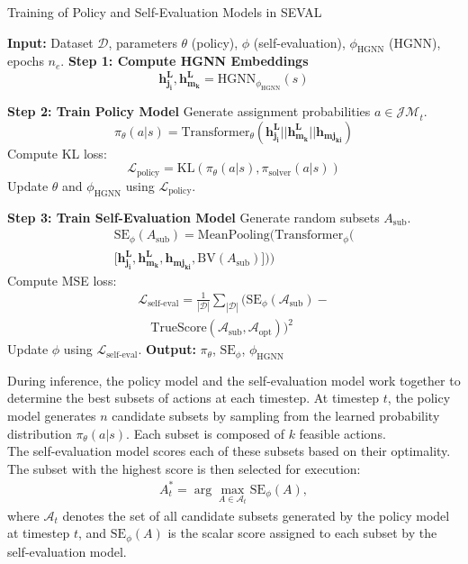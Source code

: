 \begin{algorithm}[h]
\caption{Training of Policy and Self-Evaluation Models in SEVAL}
\label{algo:training}
\begin{algorithmic}[1]
\STATE \textbf{Input:} Dataset $\mathcal{D}$, parameters $\theta$ (policy), $\phi$ (self-evaluation), $\phi_{\text{HGNN}}$ (HGNN), epochs $n_e$.
        \STATE \textbf{Step 1: Compute HGNN Embeddings}
        \[
        \boldsymbol{h_{j_{i}}^L}, \boldsymbol{h_{m_{k}}^L} = \text{HGNN}_{\phi_{\text{HGNN}}}(s)
        \]

        \STATE \textbf{Step 2: Train Policy Model}
        \STATE Generate assignment probabilities $a \in \mathcal{JM}_t$.
        \[
        \pi_\theta(a | s) = \text{Transformer}_{\theta}(\boldsymbol{h_{j_{i}}^L} || \boldsymbol{h_{m_{k}}^L} || \boldsymbol{h_{mj_{ki}}})
        \]
        \STATE Compute KL loss:
        \[
        \mathcal{L}_{\text{policy}} = \text{KL}(\pi_\theta(a | s), \pi_\text{solver}(a | s))
        \]
        \STATE Update $\theta$ and $\phi_{\text{HGNN}}$ using $\mathcal{L}_{\text{policy}}$.

        \STATE \textbf{Step 3: Train Self-Evaluation Model}
        \STATE Generate random subsets $A_\text{sub}$.
\begin{multline*}
\text{SE}_\phi(A_\text{sub}) = \text{MeanPooling} \big( \text{Transformer}_{\phi}\big(\\ 
\big[\boldsymbol{h_{j_{i}}^L}, \boldsymbol{h_{m_{k}}^L}, \boldsymbol{h_{mj_{ki}}}, \text{BV}(A_\text{sub})\big]\big)\big)
\end{multline*}
        \STATE Compute MSE loss:
\begin{multline*}
\mathcal{L}_{\text{self-eval}} = \frac{1}{|\mathcal{D}|} \sum_{|\mathcal{D}|} \big(\text{SE}_\phi(\mathcal{A}_\text{sub}) -   \\
\quad \text{TrueScore}(\mathcal{A}_\text{sub}, \mathcal{A}_{\text{opt}})\big)^2
\end{multline*}
        \STATE Update $\phi$ using $\mathcal{L}_{\text{self-eval}}$.
    \ENDFOR
\ENDFOR
\STATE \textbf{Output:} $\pi_\theta$, $\text{SE}_\phi$, $\phi_{\text{HGNN}}$
\end{algorithmic}
\end{algorithm}
During inference, the policy model and the self-evaluation model work together to determine the best subsets of actions at each timestep. At timestep $t$, the policy model generates $n$ candidate subsets by sampling from the learned probability distribution $\pi_\theta(a | s)$. Each subset is composed of $k$ feasible actions.\\

The self-evaluation model scores each of these subsets based on their optimality. The subset with the highest score is then selected for execution:
\begin{align}
A_t^* = \arg\max_{A \in \mathcal{A}_t} \text{SE}_\phi(A),
\end{align}
where $\mathcal{A}_t$ denotes the set of all candidate subsets generated by the policy model at timestep $t$, and $\text{SE}_\phi(A)$ is the scalar score assigned to each subset by the self-evaluation model. 



